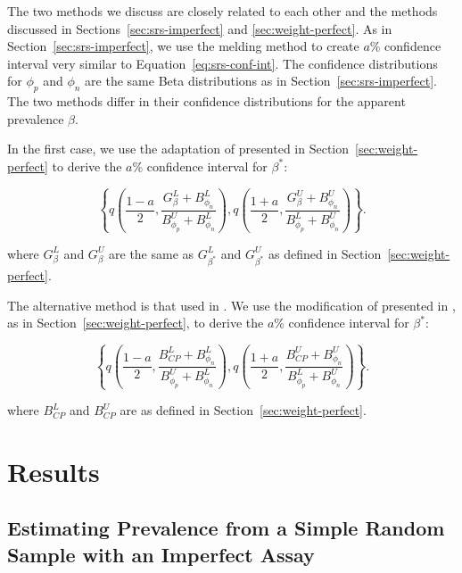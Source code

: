 \documentclass[AMA,STIX1COL]{WileyNJD-v2}
\begin{document}
The two methods we discuss are closely related to each other and the methods discussed in Sections~\ref{sec:srs-imperfect} and \ref{sec:weight-perfect}.
As in Section~\ref{sec:srs-imperfect}, we use the melding method \cite{FayP:2015} to create \( a \)\% confidence interval very similar to Equation~\ref{eq:srs-conf-int}.
The confidence distributions for \( \phi_p \) and \( \phi_n \) are the same Beta distributions as in Section~\ref{sec:srs-imperfect}.
The two methods differ in their confidence distributions for the apparent prevalence \( \beta \).

In the first case, we use the adaptation of \cite{FayF:1997} presented in Section~\ref{sec:weight-perfect} to derive the \( a \)\% confidence interval for \( \beta^* \):

\begin{equation}
    \left\{ q \left( \frac{1 - a}{2}, \frac{G_{\beta}^L + B_{\phi_n}^L }{B_{\phi_p}^U + B_{\phi_n}^L }  \right),  q \left( \frac{1 + a}{2}, \frac{G_{\beta}^U + B_{\phi_n}^U}{B_{\phi_p}^L + B_{\phi_n}^U}  \right) \right\}.
\end{equation}

where \( G_{\beta}^L \) and \( G_{\beta}^U \) are the same as \( G_{\beta^*}^L \) and \( G_{\beta^*}^U \) as defined in Section~\ref{sec:weight-perfect}.

The alternative method is that used in \cite{Kali:2021}.
We use the  modification of \cite{Korn:1998} presented in \cite{Dean:2015}, as in Section~\ref{sec:weight-perfect}, to derive the \( a \)\% confidence interval for \( \beta^* \):

\begin{equation}
    \left\{ q \left( \frac{1 - a}{2}, \frac{B_{CP}^L + B_{\phi_n}^L }{B_{\phi_p}^U + B_{\phi_n}^L }  \right),  q \left( \frac{1 + a}{2}, \frac{B_{CP}^U + B_{\phi_n}^U}{B_{\phi_p}^L + B_{\phi_n}^U}  \right) \right\}.
\end{equation}

where \( B_{CP}^L \) and \( B_{CP}^U \) are as defined in Section~\ref{sec:weight-perfect}.

\section{Results}

\subsection{Estimating Prevalence from a Simple Random Sample with an Imperfect Assay}
\end{document}
